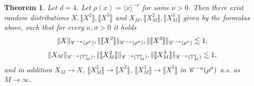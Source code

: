 \documentclass[a4paper,11pt]{article}
\newtheorem{theorem}{Theorem}[section]
\numberwithin{equation}{section}
\newcommand{\CC}{\mathscr{C} \hspace{.1em}}
\newcommand{\8}{\infty}
\begin{document}
 
 \begin{theorem}\label{thm:renorm}
Let $d=4$. Let $\rho(x)=\langle x\rangle^{-\nu}$ for some $\nu>0$. Then there exist random distributions $X,\llbracket X^{2}\rrbracket,\llbracket X^{3}\rrbracket$ and $X_{M},\llbracket X_{M}^{2}\rrbracket,\llbracket X_{M}^{3}\rrbracket$ given by the formulas above, such that for every $\kappa,\sigma>0$  it holds 
$$
\|X\|_{\CC^{-\kappa}(\rho^{\sigma})},\|\llbracket X^{2}\rrbracket\|_{\CC^{-\kappa}(\rho^{\sigma})}
,\|\llbracket X^{3}\rrbracket\|_{\CC^{-\kappa}(\rho^{\sigma})}\lesssim 1,
$$
$$
\|X_{M}\|_{\CC^{-\kappa}(\mathbb{T}^{4}_{M})},\|\llbracket X_{M}^{2}\rrbracket\|_{\CC^{-\kappa}(\mathbb{T}^{4}_{M})}
,\|\llbracket X_{M}^{3}\rrbracket\|_{\CC^{-\kappa}(\mathbb{T}^{4}_{M})}\lesssim 1,
$$
and in addition $X_{M}\to X$, $\llbracket X_{M}^{2}\rrbracket\to \llbracket X^{2}\rrbracket$, $\llbracket X_{M}^{3}\rrbracket\to \llbracket X^{3}\rrbracket$ in $\CC^{-\kappa}(\rho^{\sigma})$ a.s. as $M\to\infty$. \end{theorem}
 
\end{document}
